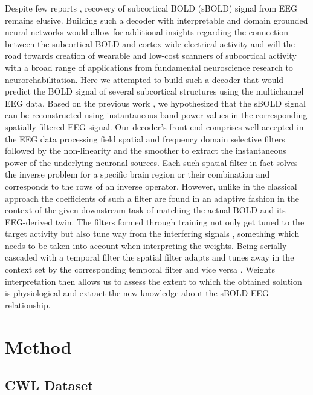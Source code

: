 \documentclass{article}
\begin{document}
Despite few reports \cite{eeg_informed, review_eeg_fmri}, recovery of subcortical BOLD (sBOLD) signal from EEG remains elusive.  Building such a decoder with interpretable and domain grounded neural networks would allow for additional insights regarding the connection between the subcortical BOLD and cortex-wide electrical activity and will the road towards creation of wearable and low-cost scanners of subcortical activity with a broad range of applications from fundamental neuroscience research to neurorehabilitation. Here we attempted to build such a decoder that would predict the BOLD signal of several subcortical structures using the multichannel EEG data. Based on the previous work \cite{ml_eeg_fmri_2, ml_eeg_fmri}, we hypothesized that the sBOLD signal can be reconstructed using instantaneous band power values in the corresponding spatially filtered EEG signal. Our decoder's front end comprises well accepted in the EEG data processing field spatial and frequency domain selective filters followed by the non-linearity and the smoother to extract the instantaneous power of the underlying neuronal sources. Each such spatial filter in fact solves the inverse problem for a specific brain region or their combination and corresponds to the rows of an inverse operator. However, unlike in the classical approach the coefficients of such a filter are found in an adaptive fashion in the context of the given downstream task of matching the actual BOLD and its EEG-derived twin. The filters formed through training not only get tuned to the target activity but also tune way from the interfering signals \cite{haufe2014interpretation}, something which needs to be taken into account when interpreting the weights. Being serially cascaded with a temporal filter the spatial filter adapts and tunes away in the context set by the corresponding temporal filter and vice versa  \cite{petrosyan2021decoding}. Weights interpretation then allows us to assess the extent to which the obtained solution is physiological and extract the new knowledge about the sBOLD-EEG relationship.  

\section{Method}
\subsection{CWL Dataset}
\end{document}
